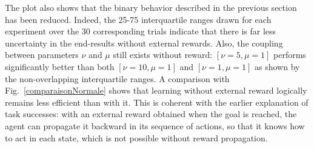 \documentclass[letterpaper, 10 pt, conference]{ieeeconf}  %
\begin{document}
The plot also shows that the binary behavior described in the previous section has been reduced. Indeed, the 25-75 interquartile ranges drawn for each experiment over the 30 corresponding trials indicate that there is far less uncertainty in the end-results without external rewards. Also, the coupling between parameters $\nu$ and $\mu$ still exists without reward: $[\nu=5,\mu =1]$ performs significantly better than both $[\nu=10,\mu =1]$ and $[\nu=1,\mu =1]$ as shown by the non-overlapping interquartile ranges. A comparison with Fig.~\ref{comparaisonNormale} shows that learning without external reward logically remains less efficient than with it. This is coherent with the earlier explanation of task successes: with an external reward obtained when the goal is reached, the agent can propagate it backward in its sequence of actions, so that it knows how to act in each state, which is not possible without reward propagation. 

\end{document}
